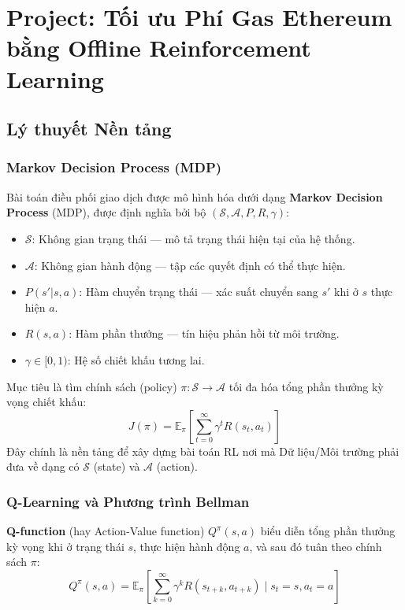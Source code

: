 \chapter{Project: Tối ưu Phí Gas Ethereum bằng Offline Reinforcement Learning}

\section{Lý thuyết Nền tảng}

\subsection{Markov Decision Process (MDP)}

Bài toán điều phối giao dịch được mô hình hóa dưới dạng \textbf{Markov Decision Process} (MDP), được định nghĩa bởi bộ $(\mathcal{S}, \mathcal{A}, P, R, \gamma)$:

\begin{itemize}
    \item $\mathcal{S}$: Không gian trạng thái — mô tả trạng thái hiện tại của hệ thống.
    \item $\mathcal{A}$: Không gian hành động — tập các quyết định có thể thực hiện.
    \item $P(s' | s, a)$: Hàm chuyển trạng thái — xác suất chuyển sang $s'$ khi ở $s$ thực hiện $a$.
    \item $R(s, a)$: Hàm phần thưởng — tín hiệu phản hồi từ môi trường.
    \item $\gamma \in [0,1)$: Hệ số chiết khấu tương lai.
\end{itemize}

Mục tiêu là tìm chính sách (policy) $\pi: \mathcal{S} \to \mathcal{A}$ tối đa hóa tổng phần thưởng kỳ vọng chiết khấu:
\begin{equation}
    J(\pi) = \mathbb{E}_\pi\left[\sum_{t=0}^{\infty} \gamma^t R(s_t, a_t)\right]
\end{equation}
Đây chính là nền tảng để xây dựng bài toán RL nơi mà Dữ liệu/Môi trường phải đưa về dạng có $\mathcal{S}$ (state) và $\mathcal{A}$ (action).

\subsection{Q-Learning và Phương trình Bellman}

\textbf{Q-function} (hay Action-Value function) $Q^\pi(s, a)$ biểu diễn tổng phần thưởng kỳ vọng khi ở trạng thái $s$, thực hiện hành động $a$, và sau đó tuân theo chính sách $\pi$:
\begin{equation}
    Q^\pi(s, a) = \mathbb{E}_\pi\left[\sum_{k=0}^{\infty} \gamma^k R(s_{t+k}, a_{t+k}) \;\Big|\; s_t = s, a_t = a\right]
\end{equation}

